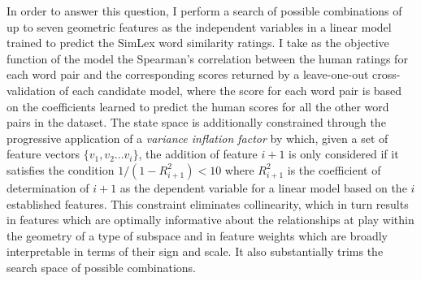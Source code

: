 In order to answer this question, I perform a search of possible combinations of up to seven geometric features as the independent variables in a linear model trained to predict the SimLex word similarity ratings.  I take as the objective function of the model the Spearman's correlation between the human ratings for each word pair and the corresponding scores returned by a leave-one-out cross-validation of each candidate model, where the score for each word pair is based on the coefficients learned to predict the human scores for all the other word pairs in the dataset.  The state space is additionally constrained through the progressive application of a \emph{variance inflation factor} \citep{OBrien2007} by which, given a set of feature vectors $\{v_1,v_2... v_i\}$, the addition of feature $i+1$ is only considered if it satisfies the condition $1/(1-R_{i+1}^{2}) < 10$ where $R_{i+1}^2$ is the coefficient of determination of $i+1$ as the dependent variable for a linear model based on the $i$ established features.  This constraint eliminates collinearity, which in turn results in features which are optimally informative about the relationships at play within the geometry of a type of subspace and in feature weights which are broadly interpretable in terms of their sign and scale.  It also substantially trims the search space of possible combinations.


